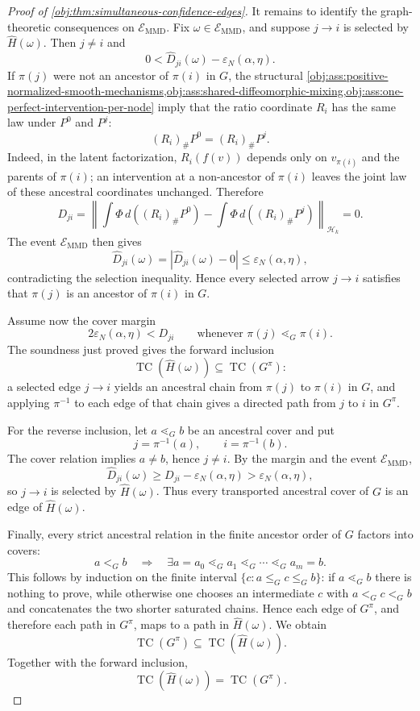 \begin{proof}[Proof of \cref{obj:thm:simultaneous-confidence-edges}]
It remains to identify the graph-theoretic consequences on \(\mathcal E_{\mathrm{MMD}}\).  Fix \(\omega\in\mathcal E_{\mathrm{MMD}}\), and suppose \(j\to i\) is selected by \(\widehat H(\omega)\).  Then \(j\ne i\) and
\[
0<\widehat D_{ji}(\omega)-\varepsilon_N(\alpha,\eta).
\]
If \(\pi(j)\) were not an ancestor of \(\pi(i)\) in \(G\), the structural \cref{obj:ass:positive-normalized-smooth-mechanisms,obj:ass:shared-diffeomorphic-mixing,obj:ass:one-perfect-intervention-per-node} imply that the ratio coordinate \(R_i\) has the same law under \(P^0\) and \(P^j\):
\[
(R_i)_\#P^0=(R_i)_\#P^j.
\]
Indeed, in the latent factorization, \(R_i(f(v))\) depends only on \(v_{\pi(i)}\) and the parents of \(\pi(i)\); an intervention at a non-ancestor of \(\pi(i)\) leaves the joint law of these ancestral coordinates unchanged.  Therefore
\[
D_{ji}
=
\left\|
\int\Phi\,d((R_i)_\#P^0)
-
\int\Phi\,d((R_i)_\#P^j)
\right\|_{\mathcal H_k}
=0.
\]
The event \(\mathcal E_{\mathrm{MMD}}\) then gives
\[
\widehat D_{ji}(\omega)
=
|\widehat D_{ji}(\omega)-0|
\le
\varepsilon_N(\alpha,\eta),
\]
contradicting the selection inequality.  Hence every selected arrow \(j\to i\) satisfies that \(\pi(j)\) is an ancestor of \(\pi(i)\) in \(G\).

Assume now the cover margin
\[
2\varepsilon_N(\alpha,\eta)<D_{ji}
\qquad
\text{whenever }\pi(j)\lessdot_G\pi(i).
\]
The soundness just proved gives the forward inclusion
\[
\operatorname{TC}(\widehat H(\omega))
\subseteq
\operatorname{TC}(G^\pi):
\]
a selected edge \(j\to i\) yields an ancestral chain from \(\pi(j)\) to \(\pi(i)\) in \(G\), and applying \(\pi^{-1}\) to each edge of that chain gives a directed path from \(j\) to \(i\) in \(G^\pi\).

For the reverse inclusion, let \(a\lessdot_G b\) be an ancestral cover and put
\[
j=\pi^{-1}(a),
\qquad
i=\pi^{-1}(b).
\]
The cover relation implies \(a\ne b\), hence \(j\ne i\).  By the margin and the event \(\mathcal E_{\mathrm{MMD}}\),
\[
\widehat D_{ji}(\omega)
\ge
D_{ji}-\varepsilon_N(\alpha,\eta)
>
\varepsilon_N(\alpha,\eta),
\]
so \(j\to i\) is selected by \(\widehat H(\omega)\).  Thus every transported ancestral cover of \(G\) is an edge of \(\widehat H(\omega)\).

Finally, every strict ancestral relation in the finite ancestor order of \(G\) factors into covers:
\[
a<_G b
\quad\Longrightarrow\quad
\exists a=a_0\lessdot_G a_1\lessdot_G\cdots\lessdot_G a_m=b.
\]
This follows by induction on the finite interval
\(\{c:a\le_G c\le_G b\}\): if \(a\lessdot_G b\) there is nothing to prove, while otherwise one chooses an intermediate \(c\) with \(a<_G c<_G b\) and concatenates the two shorter saturated chains.  Hence each edge of \(G^\pi\), and therefore each path in \(G^\pi\), maps to a path in \(\widehat H(\omega)\).  We obtain
\[
\operatorname{TC}(G^\pi)
\subseteq
\operatorname{TC}(\widehat H(\omega)).
\]
Together with the forward inclusion,
\[
\operatorname{TC}(\widehat H(\omega))
=
\operatorname{TC}(G^\pi).
\]
\end{proof}
